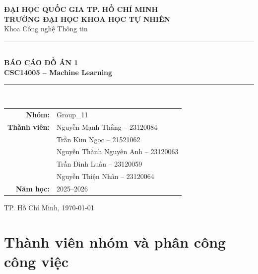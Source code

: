 \documentclass[12pt,a4paper]{article}
\let\oldpart\part
\renewcommand{\part}{%
  \setcounter{section}{0}%
  \setcounter{subsection}{0}%
  \oldpart
}
\begin{document}
\begin{titlepage}
\thispagestyle{empty}
\centering
\vspace*{1.15cm}
{\Large \textbf{ĐẠI HỌC QUỐC GIA TP. HỒ CHÍ MINH}}\\[0.15cm]
{\Large \textbf{TRƯỜNG ĐẠI HỌC KHOA HỌC TỰ NHIÊN}}\\[0.25cm]
{\large Khoa Công nghệ Thông tin}\\[2.0cm]

{\color{HCMUSBlue}\rule{0.68\linewidth}{0.7pt}}\\[0.75cm]
{\fontsize{24}{30}\selectfont\bfseries\color{HCMUSBlue} BÁO CÁO ĐỒ ÁN 1}\\[0.45cm]
{\Large\bfseries CSC14005 -- Machine Learning}\\[0.35cm]
{\color{HCMUSBlue}\rule{0.68\linewidth}{0.7pt}}\\[1.4cm]

\begin{tabular}{rl}
\textbf{Nhóm:} & Group\_11 \\[4pt]
\textbf{Thành viên:} & Nguyễn Mạnh Thắng -- 23120084 \\
& Trần Kim Ngọc -- 21521062 \\
& Nguyễn Thành Nguyên Anh -- 23120063 \\
& Trần Đình Luân -- 23120059 \\
& Nguyễn Thiện Nhân -- 23120064 \\[4pt]
\textbf{Năm học:} & 2025--2026
\end{tabular}

\vfill
{\large TP. Hồ Chí Minh, \today}
\end{titlepage}

\tableofcontents
\newpage

\part{Thành viên nhóm và phân công công việc}
\end{document}
